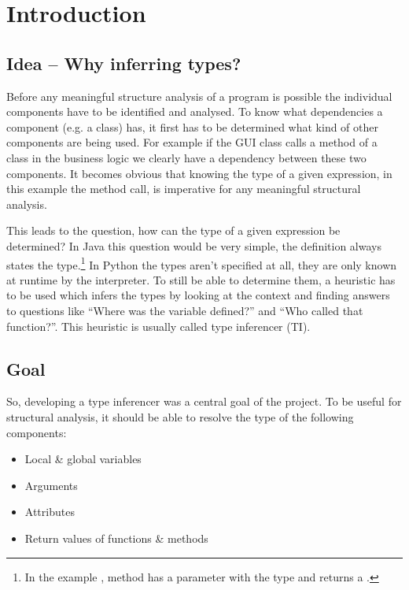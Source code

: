 \documentclass[12pt,halfparskip,DIV11,BCOR10mm]{scrreprt}
\begin{document}
\section{Introduction}

\subsection{Idea – Why inferring types?}

Before any meaningful structure analysis of a program is possible the individual components have to be identified and analysed. To know what dependencies a component (e.g. a class) has, it first has to be determined what kind of other components are being used. For example if the GUI class calls a method of a class in the business logic we clearly have a dependency between these two components. It becomes obvious that knowing the type of a given expression, in this example the method call, is imperative for any meaningful structural analysis.

This leads to the question, how can the type of a given expression be determined? In Java this question would be very simple, the definition always states the type.\footnote{In the example , method  has a parameter  with the type  and returns a .} In Python the types aren't specified at all, they are only known at runtime by the interpreter. To still be able to determine them, a heuristic has to be used which infers the types by looking at the context and finding answers to questions like ``Where was the variable defined?'' and ``Who called that function?''. This heuristic is usually called type inferencer (TI).


\subsection{Goal}

So, developing a type inferencer was a central goal of the project. To be useful for structural analysis, it should be able to resolve the type of the following components:

\begin{itemize}
	\item Local \& global variables
	\item Arguments
	\item Attributes
	\item Return values of functions \& methods
\end{itemize}
\end{document}
